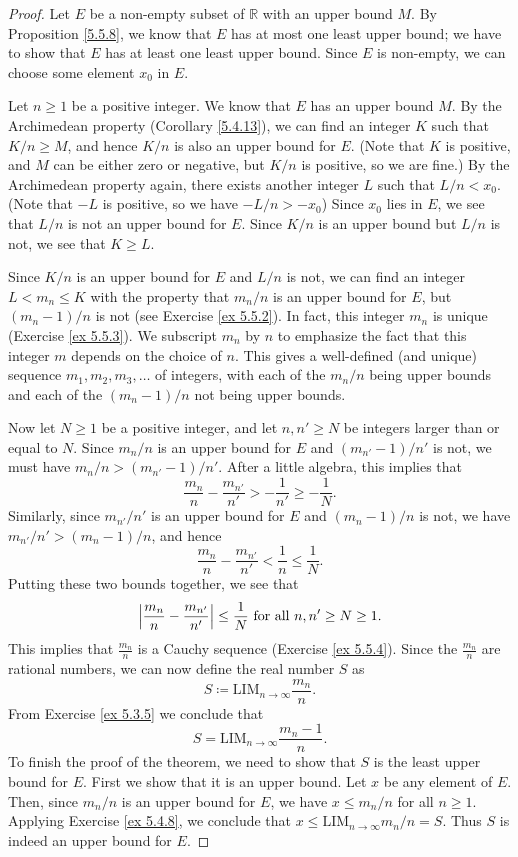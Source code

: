 \begin{proof}
Let \(E\) be a non-empty subset of \(\mathds{R}\) with an upper bound \(M\).
By Proposition \ref{5.5.8}, we know that \(E\) has at most one least upper bound;
we have to show that \(E\) has at least one least upper bound.
Since \(E\) is non-empty, we can choose some element \(x_0\) in \(E\).

Let \(n \geq 1\) be a positive integer.
We know that \(E\) has an upper bound \(M\).
By the Archimedean property (Corollary \ref{5.4.13}), we can find an integer \(K\) such that \(K / n \geq M\), and hence \(K / n\) is also an upper bound for \(E\).
(Note that \(K\) is positive, and \(M\) can be either zero or negative, but \(K / n\) is positive, so we are fine.)
By the Archimedean property again, there exists another integer \(L\) such that \(L / n < x_0\).
(Note that \(-L\) is positive, so we have \(-L / n > -x_0\))
Since \(x_0\) lies in \(E\), we see that \(L / n\) is not an upper bound for \(E\).
Since \(K / n\) is an upper bound but \(L / n\) is not, we see that \(K \geq L\).

Since \(K / n\) is an upper bound for \(E\) and \(L / n\) is not, we can find an integer \(L < m_n \leq K\) with the property that \(m_n / n\) is an upper bound for \(E\), but \((m_n - 1) / n\) is not (see Exercise \ref{ex 5.5.2}).
In fact, this integer \(m_n\) is unique (Exercise \ref{ex 5.5.3}).
We subscript \(m_n\) by \(n\) to emphasize the fact that this integer \(m\) depends on the choice of \(n\).
This gives a well-defined (and unique) sequence \(m_1, m_2, m_3, \dots\) of integers, with each of the \(m_n / n\) being upper bounds and each of the \((m_n - 1) / n\) not being upper bounds.

Now let \(N \geq 1\) be a positive integer, and let \(n, n' \geq N\) be integers larger than or equal to \(N\).
Since \(m_n / n\) is an upper bound for \(E\) and \((m_{n'} - 1) / n'\) is not, we must have \(m_n / n > (m_{n'} - 1) / n'\).
After a little algebra, this implies that
\[
    \frac{m_n}{n} - \frac{m_{n'}}{n'} > -\frac{1}{n'} \geq -\frac{1}{N}.
\]
Similarly, since \(m_{n'} / n'\) is an upper bound for \(E\) and \((m_n - 1) / n\) is not, we have \(m_{n'} / n' > (m_n - 1) / n\), and hence
\[
    \frac{m_n}{n} - \frac{m_{n'}}{n'} < \frac{1}{n} \leq \frac{1}{N}.
\]
Putting these two bounds together, we see that
\[
    \abs*{\frac{m_n}{n} - \frac{m_{n'}}{n'}} \leq \frac{1}{N} \text{ for all } n, n' \geq N \geq 1.
\]
This implies that \(\frac{m_n}{n}\) is a Cauchy sequence (Exercise \ref{ex 5.5.4}).
Since the \(\frac{m_n}{n}\) are rational numbers, we can now define the real number \(S\) as
\[
    S \coloneqq \text{LIM}_{n \to \infty} \frac{m_n}{n}.
\]
From Exercise \ref{ex 5.3.5} we conclude that
\[
    S = \text{LIM}_{n \to \infty} \frac{m_n - 1}{n}.
\]
To finish the proof of the theorem, we need to show that \(S\) is the least upper bound for \(E\).
First we show that it is an upper bound.
Let \(x\) be any element of \(E\).
Then, since \(m_n / n\) is an upper bound for \(E\), we have \(x \leq m_n / n\) for all \(n \geq 1\).
Applying Exercise \ref{ex 5.4.8}, we conclude that \(x \leq \text{LIM}_{n \to \infty} m_n / n = S\).
Thus \(S\) is indeed an upper bound for \(E\).


\end{proof}

